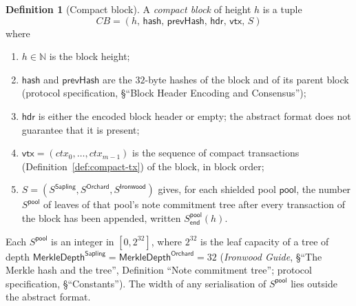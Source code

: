 \documentclass[11pt,a4paper]{article}
\theoremstyle{definition}
\newtheorem{definition}[theorem]{Definition}
\newcommand{\N}{\mathbb{N}}
\begin{document}
\begin{definition}[Compact block]\label{def:compact-block}
A \emph{compact block} of height $h$ is a tuple
\[
  \mathit{CB} = (h,\, \mathsf{hash},\, \mathsf{prevHash},\,
    \mathsf{hdr},\, \mathsf{vtx},\, S)
\]
where
\begin{enumerate}
\item $h \in \N$ is the block height;
\item $\mathsf{hash}$ and $\mathsf{prevHash}$ are the $32$-byte hashes of the
  block and of its parent block (protocol specification, \S``Block Header
  Encoding and Consensus'');
\item $\mathsf{hdr}$ is either the encoded block header or empty; the
  abstract format does not guarantee that it is present;
\item $\mathsf{vtx} = (\mathit{ctx}_0, \dots, \mathit{ctx}_{m-1})$ is the
  sequence of compact transactions (Definition~\ref{def:compact-tx}) of the
  block, in block order;
\item $S = (S^{\mathsf{Sapling}}, S^{\mathsf{Orchard}},
  S^{\mathsf{Ironwood}})$ gives, for each shielded pool $\mathsf{pool}$, the
  number $S^{\mathsf{pool}}$ of leaves of that pool's note commitment tree
  after every transaction of the block has been appended, written
  $S^{\mathsf{pool}}_{\mathsf{end}}(h)$.
\end{enumerate}
Each $S^{\mathsf{pool}}$ is an integer in $[0, 2^{32}]$, where $2^{32}$ is
the leaf capacity of a tree of depth
$\mathsf{MerkleDepth}^{\mathsf{Sapling}} =
\mathsf{MerkleDepth}^{\mathsf{Orchard}} = 32$ (\emph{Ironwood Guide},
\S``The Merkle hash and the tree'', Definition ``Note commitment tree'';
protocol specification, \S``Constants''). The width of any serialisation of
$S^{\mathsf{pool}}$ lies outside the abstract format.
\end{definition}
\end{document}

